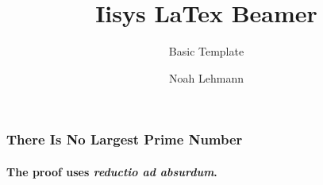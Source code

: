\documentclass[12pt]{beamer}
\title{Iisys LaTex Beamer}
\subtitle{Basic Template}
\author{Noah Lehmann}
\institute{FG Intelligente \& Lernende Systeme}
\begin{document}
    \begin{frame}
        \titlepage
    \end{frame}


    \begin{frame}
        \frametitle{There Is No Largest Prime Number}
        \framesubtitle{The proof uses \textit{reductio ad absurdum}.}

    \end{frame}
\end{document}
